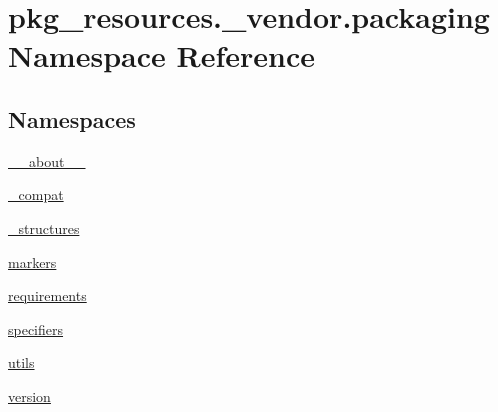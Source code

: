 \hypertarget{namespacepkg__resources_1_1__vendor_1_1packaging}{}\section{pkg\+\_\+resources.\+\_\+vendor.\+packaging Namespace Reference}
\label{namespacepkg__resources_1_1__vendor_1_1packaging}
\subsection*{Namespaces}
\begin{DoxyCompactItemize}
\item 
 \hyperlink{namespacepkg__resources_1_1__vendor_1_1packaging_1_1____about____}{\+\_\+\+\_\+about\+\_\+\+\_\+}
\item 
 \hyperlink{namespacepkg__resources_1_1__vendor_1_1packaging_1_1__compat}{\+\_\+compat}
\item 
 \hyperlink{namespacepkg__resources_1_1__vendor_1_1packaging_1_1__structures}{\+\_\+structures}
\item 
 \hyperlink{namespacepkg__resources_1_1__vendor_1_1packaging_1_1markers}{markers}
\item 
 \hyperlink{namespacepkg__resources_1_1__vendor_1_1packaging_1_1requirements}{requirements}
\item 
 \hyperlink{namespacepkg__resources_1_1__vendor_1_1packaging_1_1specifiers}{specifiers}
\item 
 \hyperlink{namespacepkg__resources_1_1__vendor_1_1packaging_1_1utils}{utils}
\item 
 \hyperlink{namespacepkg__resources_1_1__vendor_1_1packaging_1_1version}{version}
\end{DoxyCompactItemize}
